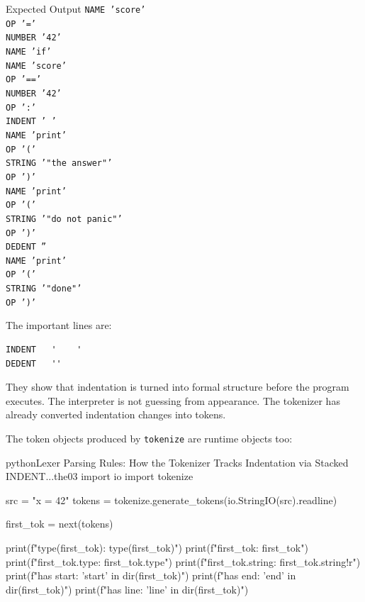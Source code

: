 \begin{iobox}{Expected Output}
\texttt{NAME     'score'} \\
\texttt{OP       '='} \\
\texttt{NUMBER   '42'} \\
\texttt{NAME     'if'} \\
\texttt{NAME     'score'} \\
\texttt{OP       '=='} \\
\texttt{NUMBER   '42'} \\
\texttt{OP       ':'} \\
\texttt{INDENT   '    '} \\
\texttt{NAME     'print'} \\
\texttt{OP       '('} \\
\texttt{STRING   '"the answer"'} \\
\texttt{OP       ')'} \\
\texttt{NAME     'print'} \\
\texttt{OP       '('} \\
\texttt{STRING   '"do not panic"'} \\
\texttt{OP       ')'} \\
\texttt{DEDENT   ''} \\
\texttt{NAME     'print'} \\
\texttt{OP       '('} \\
\texttt{STRING   '"done"'} \\
\texttt{OP       ')'} \\
\end{iobox}


The important lines are:

\begin{verbatim}
INDENT   '    '
DEDENT   ''
\end{verbatim}

They show that indentation is turned into formal structure before the program executes. The interpreter is not guessing from appearance. The tokenizer has already converted indentation changes into tokens.

The token objects produced by \texttt{tokenize} are runtime objects too:

\begin{codebox}[]{python}{Lexer Parsing Rules: How the Tokenizer Tracks Indentation via Stacked INDENT...}{the03}
import io
import tokenize

src = "x = 42\n"
tokens = tokenize.generate_tokens(io.StringIO(src).readline)

first_tok = next(tokens)

print(f"type(first_tok): {type(first_tok)}")
print(f"first_tok: {first_tok}")
print(f"first_tok.type: {first_tok.type}")
print(f"first_tok.string: {first_tok.string!r}")
print(f"has start: {'start' in dir(first_tok)}")
print(f"has end: {'end' in dir(first_tok)}")
print(f"has line: {'line' in dir(first_tok)}")
\end{codebox}


